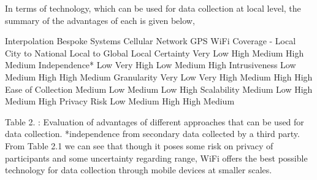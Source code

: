 In terms of technology, which can be used for data collection at local level, the summary of the advantages of each is given below,

	Interpolation
	Bespoke Systems
	Cellular Network
	GPS 
	WiFi
	Coverage
	-
	Local
	City to National
	Local to Global
	Local
	Certainty
	Very Low
	High
	Medium
	High
	Medium
	Independence*
	Low
	Very High
	Low
	Medium
	High
	Intrusiveness
	Low
	Medium
	High
	High
	Medium
	Granularity
	Very Low
	Very High
	Medium
	High
	High
	Ease of Collection
	Medium
	Low
	Medium
	Low
	High
	Scalability
	Medium
	Low
	High
	Medium
	High
	Privacy Risk
	Low
	Medium
	High
	High
	Medium
	

Table 2.
: Evaluation of advantages of different approaches that can be used for data collection.
*independence from secondary data collected by a third party.
From Table 2.1 we can see that though it poses some risk on privacy of participants and some uncertainty regarding range, WiFi offers the best possible technology for data collection through mobile devices at smaller scales.
